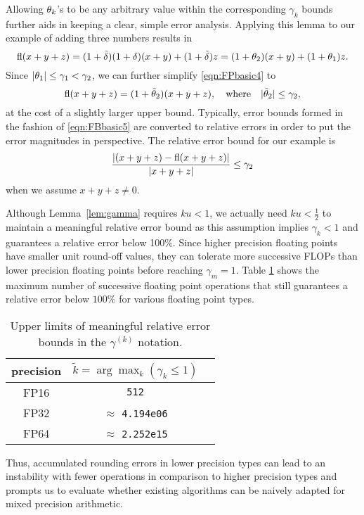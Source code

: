 Allowing $\theta_{k}$'s to be any arbitrary value within the corresponding $\gamma_{k}$ bounds further aids in keeping a clear, simple error analysis. 
Applying this lemma to our example of adding three numbers results in
\begin{equation}
\fl(x+y+z) = (1+\tilde{\dd})(1+\dd) (x+y) + (1+\tilde{\dd})z = (1+\tth_{2})(x+y) + (1+\tth_{1})z. \label{eqn:FPbasic4}
\end{equation}
Since $|\theta_{1}| \leq \gamma_{1} < \gamma_{2}$, we can further simplify \cref{eqn:FPbasic4} to
\begin{equation}
\fl(x+y+z) = (1+\tilde{\tth}_{2})(x+y+z), \quad \mbox{where} \quad |\tilde{\tth}_{2}| \leq \gamma_{2}, \label{eqn:FBbasic5}
\end{equation}
at the cost of a slightly larger upper bound. 
Typically, error bounds formed in the fashion of \cref{eqn:FBbasic5} are converted to relative errors in order to put the error magnitudes in perspective.
The relative error bound for our example is
\begin{equation*}
\frac{|(x+y+z) - \mathrm{fl}(x+y+z)|}{|x+y+z|} \leq \gamma_{2}
\end{equation*}
when we assume $x+y+z\neq 0$.\par

Although Lemma~\ref{lem:gamma} requires $ku<1$, we actually need $ku <\frac{1}{2}$ to maintain a meaningful relative error bound as this assumption implies $\gamma_k < 1$ and guarantees a relative error below 100\%. 
Since higher precision floating points have smaller unit round-off values, they can tolerate more successive FLOPs than lower precision floating points before reaching $\gamma_m=1$. 
Table \ref{table:ieeen} shows the maximum number of successive floating point operations that still guarantees a relative error below $100$\% for various floating point types. 
\begin{table}[h]
	\centering
	\begin{tabular}{||c|c|c||} 
		\hline
		precision &$\tilde{k} = \arg\max_{k}(\gamma_k \leq 1)$ \\ \hline
		FP16 & {\tt 512}\\
		FP32 & $\approx$ {\tt 4.194e06} \\ 
		FP64 &  $\approx$ {\tt 2.252e15}\\ \hline 
	\end{tabular}
	\caption{Upper limits of meaningful relative error bounds in the $\gamma^{(k)}$ notation.}
	\label{table:ieeen}
\end{table}
\vspace*{-10pt}
Thus, accumulated rounding errors in lower precision types can lead to an instability with fewer operations in comparison to higher precision types and prompts us to evaluate whether existing algorithms can be naively adapted for mixed precision arithmetic. \par

